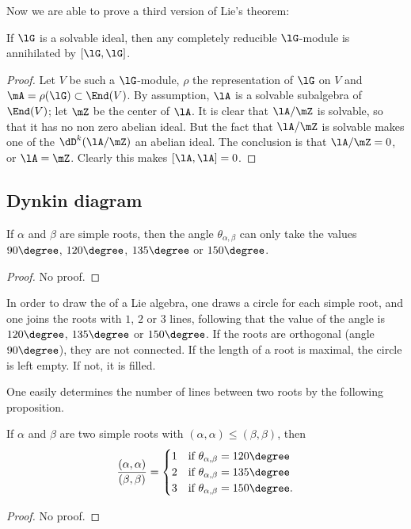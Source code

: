 Now we are able to prove a third version of Lie's theorem:
\begin{theorem}[Lie]\label{tho:Lie_trois}
If $\lG$ is a solvable ideal, then any completely reducible $\lG$-module  is annihilated by $[\lG,\lG]$.
\end{theorem}

\begin{proof}
Let $V$ be such a $\lG$-module, $\rho$ the representation of $\lG$ on $V$ and $\mA=\rho(\lG)\subset\End(V)$. By assumption, $\lA$ is a solvable subalgebra of $\End(V)$; let $\mZ$ be the center of $\lA$. It is clear that $\lA/\mZ$ is solvable, so that it has no non zero abelian ideal. But the fact that $\lA/\mZ$ is solvable makes one of the $\dD^k(\lA/\mZ)$ an abelian ideal. The conclusion is that $\lA/\mZ=0$, or $\lA=\mZ$. Clearly this makes $[\lA,\lA]=0$.
\end{proof}


                    \subsection{Dynkin diagram}

\begin{proposition}
    If $\alpha$ and $\beta$ are simple roots, then the angle $\theta_{\alpha,\beta}$ can only take the values $90\degree$, $120\degree$, $135\degree$ or $150\degree$.
\end{proposition}
\begin{proof}
    No proof.
\end{proof}

In order to draw the  of a Lie algebra, one draws a circle for each simple root, and one joins the roots with $1$, $2$ or $3$ lines, following that the value of the angle is $120\degree$, $135\degree$ or $150\degree$. If the roots are orthogonal (angle $90\degree$), they are not connected. If the length of a root is maximal, the circle is left empty. If not, it is filled.

One easily determines the number of lines between two roots by the following proposition.
\begin{proposition}         \label{PropProdNbLignes}
    If $\alpha$ and $\beta$ are two simple roots with $(\alpha,\alpha)\leq(\beta,\beta)$, then
    \begin{equation}
        \frac{ (\alpha,\alpha) }{ (\beta,\beta) }=
    \begin{cases}
        1   &\text{if $\theta_{\alpha,\beta}=120\degree$}\\
        2   &\text{if $\theta_{\alpha,\beta}=135\degree$}\\
        3   &\text{if $\theta_{\alpha,\beta}=150\degree$}.
    \end{cases}
    \end{equation}
\end{proposition}
\begin{proof}
    No proof.
\end{proof}

